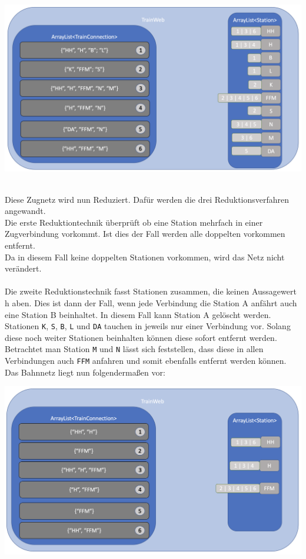 \begin{center}
    \includegraphics[width=\linewidth]{images/Programmdurchlauf/Datenstruktur01.png}
    \label{test:subsecpar:datenstruktur1}
\end{center}
\\
Diese Zugnetz wird nun Reduziert. Dafür werden die drei Reduktionsverfahren angewandt.\\
Die erste Reduktiontechnik überprüft ob eine Station mehrfach in einer Zugverbindung vorkommt. Ist dies der Fall werden alle doppelten vorkommen entfernt.\\
Da in diesem Fall keine doppelten Stationen vorkommen, wird das Netz nicht verändert.\\
\\
Die zweite Reduktionstechnik fasst Stationen zusammen, die keinen Aussagewert h aben. Dies ist dann der Fall, wenn jede Verbindung die Station A anfährt auch eine Station B beinhaltet. In diesem Fall kann Station A gelöscht werden.\\
Stationen \texttt{K}, \texttt{S}, \texttt{B}, \texttt{L} und \texttt{DA} tauchen in jeweils nur einer Verbindung vor. Solang diese noch weiter Stationen beinhalten können diese sofort entfernt werden. Betrachtet man Station \texttt{M} und \texttt{N} lässt sich feststellen, dass diese in allen Verbindungen auch \texttt{FFM} anfahren und somit ebenfalls entfernt werden können.\\
Das Bahnnetz liegt nun folgendermaßen vor:\\

\begin{center}
    \includegraphics[width=\linewidth]{images/Programmdurchlauf/Datenstruktur02.png}
    \label{test:subsecpar:datenstruktur2}
\end{center}

